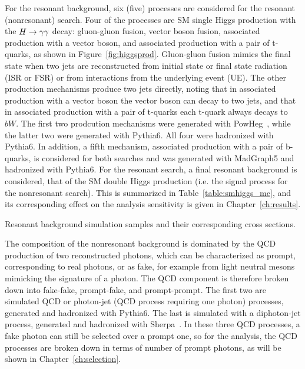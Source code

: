 For the resonant background, six (five) processes are considered for the resonant (nonresonant) search.
Four of the processes are SM single Higgs production with the $H\to\gamma\gamma$ decay: gluon-gluon fusion, vector
boson fusion, associated production with a vector boson, and associated production with a pair of
t-quarks, as shown in Figure~\ref{fig:higgsprod}. Gluon-gluon fusion mimics the final state when two
jets are reconstructed from initial state or final state radiation (ISR or FSR)
or from interactions from the underlying event (UE).
The other production mechanisms produce two jets directly,
noting that in associated production with a vector boson the vector boson can decay to two jets, and
that in associated production with a pair of t-quarks each t-quark always decays to $bW$.
The first two prodcution mechanisms were generated with PowHeg~\cite{POWHEG_Frixione:2007vw},
while the latter two were generated with Pythia6.
All four were hadronized with Pythia6.
In addition, a fifth mechanism, associated production with a pair of b-quarks, is considered for
both searches and was generated with MadGraph5 and hadronized with Pythia6.
For the resonant search, a final resonant background is considered, that of the
SM double Higgs production (i.e. the signal process for the nonresonant search).
This is summarized in Table~\ref{table:smhiggs_mc}, and its corresponding effect on the analysis
sensitivity is given in Chapter~\ref{ch:results}.

\begin{table}[ht]
  \centering
  \renewcommand{\arraystretch}{1.4}
  \caption{Resonant background simulation samples and their corresponding cross sections.}
  
  \label{table:smhiggs_mc}
\end{table}

The composition of the nonresonant background is dominated by the QCD production of two
reconstructed photons, which can be characterized as prompt, corresponding to real photons,
or as fake, for example from light neutral mesons mimicking the signature of a photon. The QCD component
is therefore broken down into fake-fake, prompt-fake, and prompt-prompt. The first two are simulated
QCD or photon-jet (QCD process requiring one photon) processes, generated and hadronized with Pythia6.
The last is simulated with a diphoton-jet process, generated and hadronized
with Sherpa~\cite{Gleisberg:2008ta}. In these three QCD processes,
a fake photon can still be selected over a prompt one, so for the analysis, the QCD processes are
broken down in terms of number of prompt photons, as will be shown in Chapter~\ref{ch:selection}.

